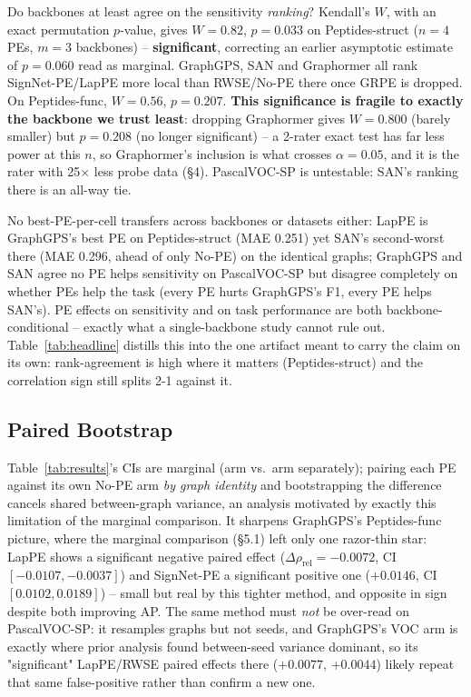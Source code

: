 \documentclass[10pt]{article}
\begin{document}
Do backbones at least agree on the sensitivity \emph{ranking}? Kendall's $W$, with an exact permutation $p$-value, gives $W{=}0.82$, $p{=}0.033$ on Peptides-struct ($n{=}4$ PEs, $m{=}3$ backbones) -- \textbf{significant}, correcting an earlier asymptotic estimate of $p{=}0.060$ read as marginal. GraphGPS, SAN and Graphormer all rank SignNet-PE/LapPE more local than RWSE/No-PE there once GRPE is dropped. On Peptides-func, $W{=}0.56$, $p{=}0.207$. \textbf{This significance is fragile to exactly the backbone we trust least}: dropping Graphormer gives $W{=}0.800$ (barely smaller) but $p{=}0.208$ (no longer significant) -- a 2-rater exact test has far less power at this $n$, so Graphormer's inclusion is what crosses $\alpha{=}0.05$, and it is the rater with 25$\times$ less probe data (\S4). PascalVOC-SP is untestable: SAN's ranking there is an all-way tie.

No best-PE-per-cell transfers across backbones or datasets either: LapPE is GraphGPS's best PE on Peptides-struct (MAE 0.251) yet SAN's second-worst there (MAE 0.296, ahead of only No-PE) on the identical graphs; GraphGPS and SAN agree no PE helps sensitivity on PascalVOC-SP but disagree completely on whether PEs help the task (every PE hurts GraphGPS's F1, every PE helps SAN's). PE effects on sensitivity and on task performance are both backbone-conditional -- exactly what a single-backbone study cannot rule out. Table~\ref{tab:headline} distills this into the one artifact meant to carry the claim on its own: rank-agreement is high where it matters (Peptides-struct) and the correlation sign still splits 2-1 against it.



\subsection{Paired Bootstrap}
Table~\ref{tab:results}'s CIs are marginal (arm vs.\ arm separately); pairing each PE against its own No-PE arm \emph{by graph identity} and bootstrapping the difference cancels shared between-graph variance, an analysis motivated by exactly this limitation of the marginal comparison. It sharpens GraphGPS's Peptides-func picture, where the marginal comparison (\S5.1) left only one razor-thin star: LapPE shows a significant negative paired effect ($\Delta\rho_{\text{rel}}{=}{-}0.0072$, CI $[-0.0107,-0.0037]$) and SignNet-PE a significant positive one ($+0.0146$, CI $[0.0102,0.0189]$) -- small but real by this tighter method, and opposite in sign despite both improving AP. The same method must \emph{not} be over-read on PascalVOC-SP: it resamples graphs but not seeds, and GraphGPS's VOC arm is exactly where prior analysis found between-seed variance dominant, so its "significant" LapPE/RWSE paired effects there ($+0.0077$, $+0.0044$) likely repeat that same false-positive rather than confirm a new one.
\end{document}
